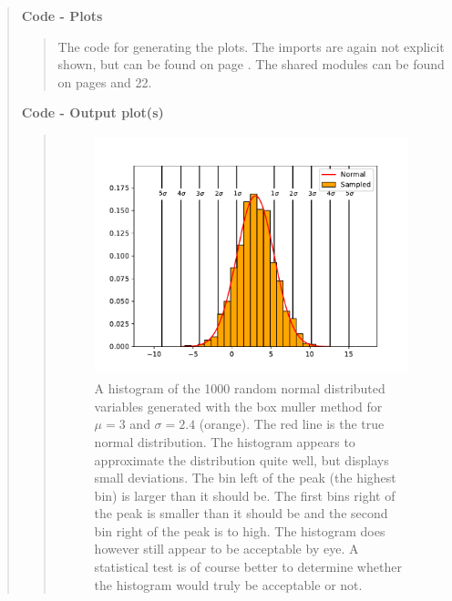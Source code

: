 \begin{quote}
\begin{quote}
\end{quote}

\textbf{Code - Plots}

\begin{quote}
The code for generating the plots. The imports are again not explicit shown, but can be found on page \pageref{CODE:MAIN1}. The shared modules can be found on pages \pageref{CODE:RNG} and 22. 



\end{quote}


\textbf{Code - Output plot(s)}
\vspace*{-0.5cm}
\begin{quote}
\begin{figure}[!hb]
\centering
\includegraphics[width=13cm, height=7.0cm]{./Plots/1_hist_gaussian.pdf}
\caption{A histogram of the 1000 random normal distributed variables generated with the box muller method for $\mu = 3$ and $\sigma = 2.4$  (orange). The red line is the true normal distribution.  The histogram appears to approximate the distribution quite well, but displays small deviations. The bin left of the peak (the highest bin) is larger than it should be. The first bins right of the peak is smaller than it should be and the second bin right of the peak is to high.  The histogram does however still appear to be acceptable by eye. A statistical test is of course better to determine whether the histogram would truly be acceptable or not.}
\label{fig:normal}
\end{figure}
\end{quote}
\end{quote}

%

